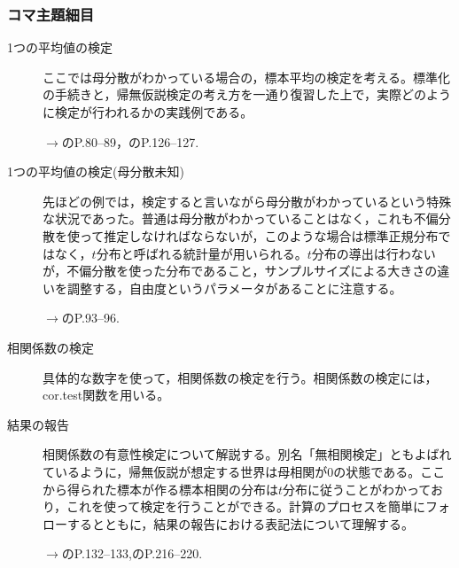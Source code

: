 \subsubsection{コマ主題細目}
\begin{description}

\item[1つの平均値の検定]ここでは母分散がわかっている場合の，標本平均の検定を考える。標準化の手続きと，帰無仮説検定の考え方を一通り復習した上で，実際どのように検定が行われるかの実践例である。
\begin{flushright}
    $\to$\citet{川端201408}のP.80--89，\citet{Yamada2004}のP.126--127.
\end{flushright}

\item[1つの平均値の検定(母分散未知)]先ほどの例では，検定すると言いながら母分散がわかっているという特殊な状況であった。普通は母分散がわかっていることはなく，これも不偏分散を使って推定しなければならないが，このような場合は標準正規分布ではなく，$t$分布と呼ばれる統計量が用いられる。$t$分布の導出は行わないが，不偏分散を使った分布であること，サンプルサイズによる大きさの違いを調整する，自由度というパラメータがあることに注意する。
\begin{flushright}
    $\to$\citet{川端201408}のP.93--96.
\end{flushright}


\item[相関係数の検定]具体的な数字を使って，相関係数の検定を行う。相関係数の検定には，cor.test関数を用いる。

\item[結果の報告]相関係数の有意性検定について解説する。別名「無相関検定」ともよばれているように，帰無仮説が想定する世界は母相関が0の状態である。ここから得られた標本が作る標本相関の分布は$t$分布に従うことがわかっており，これを使って検定を行うことができる。計算のプロセスを簡単にフォローするとともに，結果の報告における表記法について理解する。
\begin{flushright}
    $\to$\citet{Yamada2004}のP.132--133,\citet{山内201001}のP.216--220.
\end{flushright}


\end{description}
